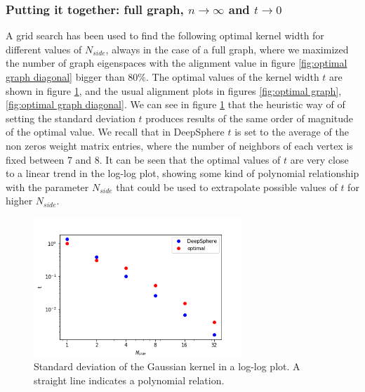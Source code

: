 \subsubsection{Putting it together: full graph, $n\to\infty$ and $t\to 0$}
A grid search has been used to find the following optimal kernel width for different values of $N_{side}$, always in the case of a full graph, where we maximized the number of graph eigenspaces with the alignment value in figure \ref{fig:optimal graph diagonal} bigger than $80\%$. The optimal values of the kernel width $t$ are shown in figure \ref{fig:t}, and the usual alignment plots in figures \ref{fig:optimal graph}, \ref{fig:optimal graph diagonal}. We can see in figure \ref{fig:t} that the heuristic way of \cite{DeepSphere} of setting the standard deviation $t$ produces results of the same order of magnitude of the optimal value. We recall that in DeepSphere $t$ is set to the average of the non zeros weight matrix entries, where the number of neighbors of each vertex is fixed between 7 and 8. It can be seen that the optimal values of $t$ are very close to a linear trend in the log-log plot, showing some kind of polynomial relationship with the parameter $N_{side}$ that could be used to extrapolate possible values of $t$ for higher $N_{side}$.
\begin{figure}[h]
	\centering
	\includegraphics[width=0.7\textwidth]{../codes/02.HeatKernelGraphLaplacian/HEALPix/06_figures/kernelwidth.png}
\caption{\label{fig:t}Standard deviation of the Gaussian kernel  in a log-log plot. A straight line indicates a polynomial relation.}
\end{figure}
